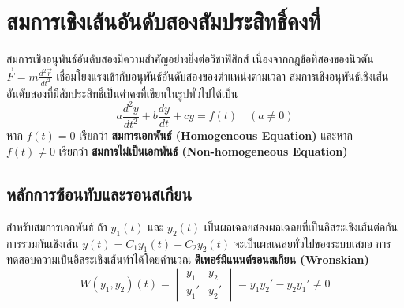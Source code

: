 \section{สมการเชิงเส้นอันดับสองสัมประสิทธิ์คงที่}
สมการเชิงอนุพันธ์อันดับสองมีความสำคัญอย่างยิ่งต่อวิชาฟิสิกส์ เนื่องจากกฎข้อที่สองของนิวตัน $\vec{F} = m\frac{d^2\vec{r}}{dt^2}$ เชื่อมโยงแรงเข้ากับอนุพันธ์อันดับสองของตำแหน่งตามเวลา สมการเชิงอนุพันธ์เชิงเส้นอันดับสองที่มีสัมประสิทธิ์เป็นค่าคงที่เขียนในรูปทั่วไปได้เป็น
\begin{equation}
a\frac{d^2y}{dt^2} + b\frac{dy}{dt} + cy = f(t) \quad (a \neq 0)
\end{equation}
หาก $f(t) = 0$ เรียกว่า \textbf{สมการเอกพันธ์ (Homogeneous Equation)} และหาก $f(t) \neq 0$ เรียกว่า \textbf{สมการไม่เป็นเอกพันธ์ (Non-homogeneous Equation)}

\subsection{หลักการซ้อนทับและรอนสเกียน}
สำหรับสมการเอกพันธ์ ถ้า $y_1(t)$ และ $y_2(t)$ เป็นผลเฉลยสองผลเฉลยที่เป็นอิสระเชิงเส้นต่อกัน การรวมกันเชิงเส้น $y(t) = C_1 y_1(t) + C_2 y_2(t)$ จะเป็นผลเฉลยทั่วไปของระบบเสมอ การทดสอบความเป็นอิสระเชิงเส้นทำได้โดยคำนวณ \textbf{ดีเทอร์มิแนนต์รอนสเกียน (Wronskian)}
\begin{equation}
W(y_1, y_2)(t) = \begin{vmatrix}
y_1 & y_2 \\
y_1' & y_2'
\end{vmatrix} = y_1 y_2' - y_2 y_1' \neq 0
\end{equation}

